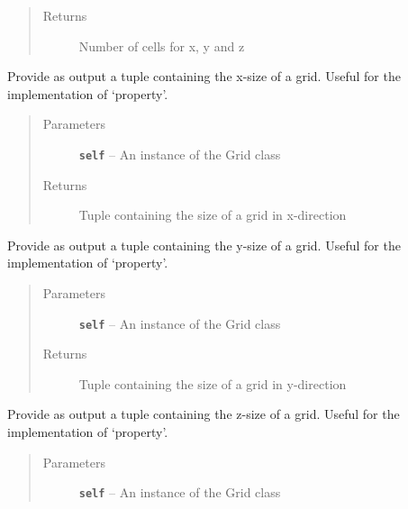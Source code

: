 \documentclass[letterpaper,10pt,english]{sphinxmanual}
\begin{document}
\begin{fulllineitems}
\begin{fulllineitems}
\begin{quote}
\begin{description}
\item[{Returns}] \leavevmode
Number of cells for x, y and z

\end{description}\end{quote}

\end{fulllineitems}


\begin{fulllineitems}
\label{hyvr:hyvr.hyvr.grid.Grid.get_lx}
Provide as output a tuple containing the x-size of a
grid. Useful for the implementation of `property'.
\begin{quote}\begin{description}
\item[{Parameters}] \leavevmode
\textbf{\texttt{self}} -- An instance of the Grid class

\item[{Returns}] \leavevmode
Tuple containing the size of a grid in x-direction

\end{description}\end{quote}

\end{fulllineitems}


\begin{fulllineitems}
\label{hyvr:hyvr.hyvr.grid.Grid.get_ly}
Provide as output a tuple containing the y-size of a
grid. Useful for the implementation of `property'.
\begin{quote}\begin{description}
\item[{Parameters}] \leavevmode
\textbf{\texttt{self}} -- An instance of the Grid class

\item[{Returns}] \leavevmode
Tuple containing the size of a grid in y-direction

\end{description}\end{quote}

\end{fulllineitems}


\begin{fulllineitems}
\label{hyvr:hyvr.hyvr.grid.Grid.get_lz}
Provide as output a tuple containing the z-size of a
grid. Useful for the implementation of `property'.
\begin{quote}\begin{description}
\item[{Parameters}] \leavevmode
\textbf{\texttt{self}} -- An instance of the Grid class


\end{description}
\end{quote}
\end{fulllineitems}
\end{fulllineitems}
\end{document}

